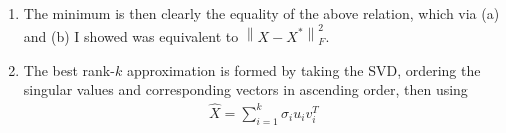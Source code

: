 \documentclass{article}
\newcommand{\norm}[1]{\left\|#1\right\|}
\begin{document}
\begin{enumerate}
    \begin{enumerate}
        \item The minimum is then clearly the equality of the above relation, which via (a) and (b) I showed was equivalent to $\norm{X-X^*}_F^2$.
        \item The best rank-$k$ approximation is formed by taking the SVD, ordering the singular values and corresponding vectors in ascending order, then using
        \begin{align*}
            \hat{X} = \sum_{i=1}^k \sigma_i u_i v_i^T
        \end{align*}
    \end{enumerate}
\end{enumerate}
\end{document}
